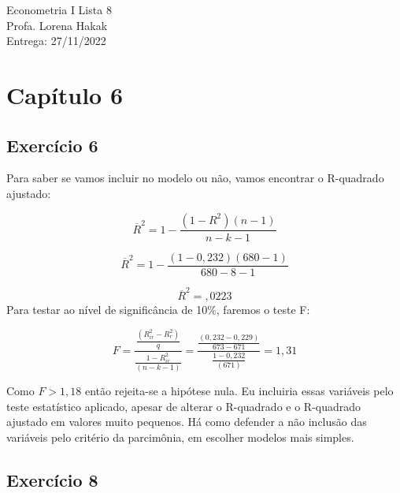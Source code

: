 \documentclass[hidelinks,11pt]{book}
\theoremstyle{definition}
\begin{document}
	
	\begin{center}
		{\Large Econometria I \hspace{0.5cm} Lista 8}\\
		Profa. Lorena Hakak\\
		Entrega: 27/11/2022
	\end{center}
	
	\vspace{0.2 cm}
	
	
	\section*{Capítulo 6}

	
	\subsection*{Exercício 6}

Para saber se vamos incluir no modelo ou não, vamos encontrar o R-quadrado ajustado:

\begin{displaymath}
	\overline{R}^2 = 1 - \frac{(1 - R^2)(n-1)}    {n-k-1}
\end{displaymath}


\begin{displaymath}
	\overline{R}^2 = 1 - \frac{(1 - 0,232)(680-1)}    {680-8-1}
\end{displaymath}

\begin{displaymath}
	\overline{R}^2 = ,0223
\end{displaymath}
Para testar ao nível de significância de 10\%, faremos o teste F:

\begin{displaymath}
	F = \frac{\frac{(R^{2}_{ir} - R^{2}_{r})}{q}}    {\frac{1 - R^{2}_{ir}}{(n-k-1)}} = \frac{\frac{(0,232 - 0,229)}{673 - 671}}    {\frac{1 - 0,232}{(671)}} = 1,31
\end{displaymath}

Como $F>1,18$ então rejeita-se a hipótese nula. Eu incluiria essas variáveis pelo teste estatístico aplicado, apesar de alterar o R-quadrado e o R-quadrado ajustado em valores muito pequenos. Há como defender a não inclusão das variáveis pelo critério da parcimônia, em escolher modelos mais simples.

	\subsection*{Exercício 8}
\end{document}
